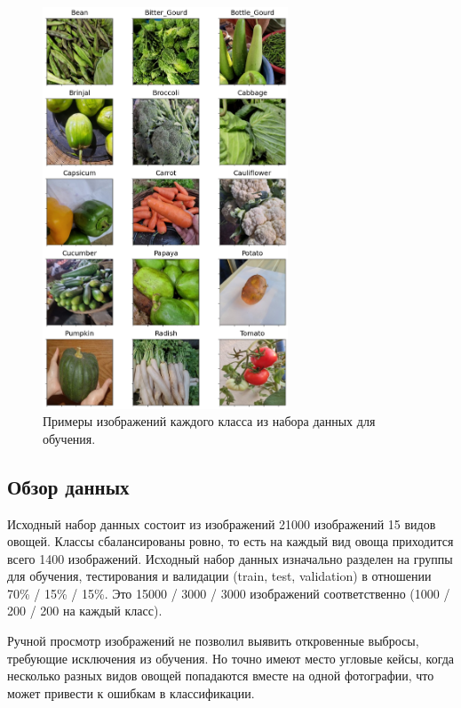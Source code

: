 \documentclass[a4paper,12pt]{extarticle}
\begin{document}
\begin{figure}[ht]
	\centering
	\includegraphics[width=0.65\textwidth]{EDA.png}
	\caption{Примеры изображений каждого класса из набора данных для обучения.}
	\label{fig:EDA}
\end{figure}

\newpage
\subsection{Обзор данных}

Исходный набор данных состоит из изображений 21000 изображений 15 видов овощей. Классы
сбалансированы ровно, то есть на каждый вид овоща приходится всего 1400 изображений. Исходный набор
данных изначально разделен на группы для обучения, тестирования и валидации (train, test, validation)
в отношении 70\% / 15\% / 15\%. Это 15000 / 3000 / 3000 изображений соответственно (1000 / 200 / 200
на каждый класс).

Ручной просмотр изображений не позволил выявить откровенные выбросы, требующие исключения из
обучения. Но точно имеют место угловые кейсы, когда несколько разных видов овощей попадаются вместе
на одной фотографии, что может привести к ошибкам в классификации.
\end{document}
